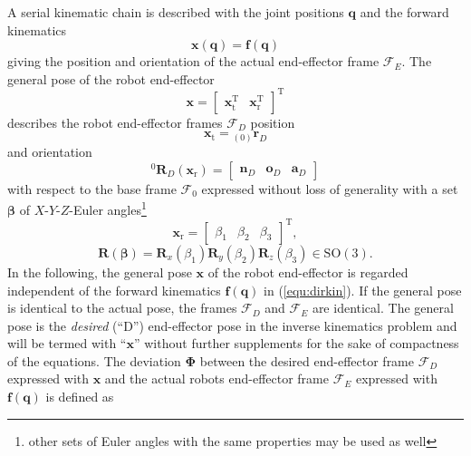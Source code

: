 \documentclass{svproc}
\newcommand{\bm}[1]{\boldsymbol{#1}}
\newcommand{\ortvek}[4]{{ }_{(#1)}{\boldsymbol{#2}}^{#3}_{#4} }
\newcommand{\vek}[3]{\boldsymbol{#1}^{#2}_{#3}}
\newcommand{\rotmat}[2]{{{ }^{#1}\boldsymbol{R}}_{#2}}
\newcommand{\transp}[0]{{\mathrm{T}}}
\newcommand{\ks}[1]{{\mathcal{F}}_{#1}}
\begin{document}
A serial kinematic chain is described with the joint positions $\bm{q}$ and the forward kinematics
%
\begin{equation}
\bm{x} (\bm{q})
=
\bm{f} (\bm{q})
\label{equ:dirkin}
\end{equation}
%
giving the position and orientation of the actual end-effector frame $\ks{E}$.
The general pose of the robot end-effector
%
\begin{equation}
\bm{x}
=
\begin{bmatrix}
\bm{x}_{\mathrm{t}}^\transp & \bm{x}_{\mathrm{r}}^\transp
\end{bmatrix}^\transp
\label{equ:x_def}
\end{equation}
%
describes the robot end-effector frames $\ks{D}$ position 
%
\begin{equation}
\bm{x}_{\mathrm{t}}
=
\ortvek{0}{r}{}{D}
\label{equ:xt_def}
\end{equation}  
%
and orientation 
%
\begin{equation}
\rotmat{0}{D} (\bm{x}_{\mathrm{r}})
=
\begin{bmatrix}\vek{n}{}{D} & \vek{o}{}{D} & \vek{a}{}{D}\end{bmatrix}
\label{equ:xr_def_rotmat}
\end{equation}  
% 
with respect to the base frame $\ks{0}$ expressed without loss of generality with a set $\bm{\beta}$ of $X$-$Y$-$Z$-Euler angles\footnote{other sets of Euler angles with the same properties may be used as well}
%
\begin{equation}
\bm{x}_{\mathrm{r}}
=
\begin{bmatrix}
\beta_1  & \beta_2 & \beta_3
\end{bmatrix}^{\mathrm{T}},
\label{equ:xr_def}
\end{equation} 
%
\begin{equation}
\bm{R}(\bm{\beta}) = \bm{R}_x(\beta_1) \bm{R}_y(\beta_2) \bm{R}_z(\beta_3) \in \mathrm{SO(3)}.
\label{equ:def_rmat_xyz}
\end{equation}
%
In the following, the general pose $\bm{x}$ of the robot end-effector is regarded independent of the forward kinematics $\bm{f}(\bm{q})$ in (\ref{equ:dirkin}).
If the general pose is identical to the actual pose, the frames $\ks{D}$ and $\ks{E}$ are identical.
The general pose is the \emph{desired} (``D'') end-effector pose in the inverse kinematics problem and will be termed with ``$\bm{x}$'' without further supplements for the sake of compactness of the equations.
The deviation $\bm{\Phi}$ between the desired end-effector frame $\ks{D}$ expressed with $\bm{x}$ and the actual robots end-effector frame $\ks{E}$ expressed with $\bm{f}(\bm{q})$ is defined as
\end{document}
